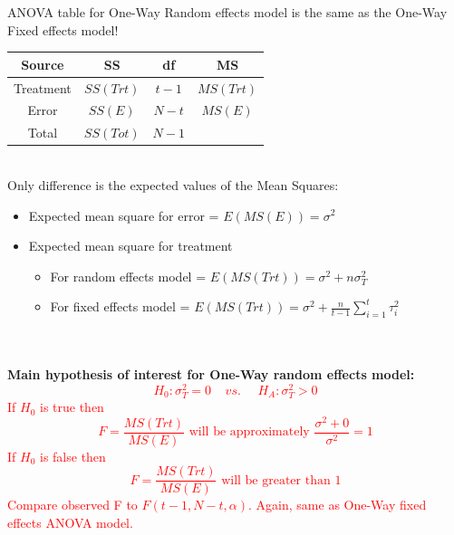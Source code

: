 ANOVA table for One-Way Random effects model is the same as the One-Way Fixed effects model!
\begin{center}
\begin{tabular}{cccc}
Source & SS & df & MS  \\ \hline
Treatment & $SS(Trt)$ & $t-1$ & $MS(Trt)$  \\
Error & $SS(E)$ & $N-t$ & $MS(E)$  \\
Total & $SS(Tot)$ & $N-1$ & \\ \hline
\end{tabular}
\end{center}
~\\
Only difference is the expected values of the Mean Squares:
\begin{itemize}
\item Expected mean square for error = $E(MS(E))=\sigma^2$
\item Expected mean square for treatment 
\begin{itemize}
\item For random effects model = $E(MS(Trt))=\sigma^2+n\sigma^2_T$\\
\item For fixed effects model = $E(MS(Trt))=\sigma^2+\frac{n}{t-1}\sum_{i=1}^{t}\tau_i^2$\\~\\~\\
\end{itemize}
\end{itemize}


\textbf{Main hypothesis of interest for One-Way random effects model:}
\textcolor{red}{$$H_0:\sigma^2_T=0~~~~~vs.~~~~~~H_A:\sigma^2_T>0$$
If $H_0$ is true then
$$F=\frac{MS(Trt)}{MS(E)}\mbox{ will be approximately }\frac{\sigma^2+0}{\sigma^2}=1$$
If $H_0$ is false then
$$F=\frac{MS(Trt)}{MS(E)}\mbox{ will be greater than }1$$
Compare observed F to $F(t-1,N-t,\alpha)$.  Again, same as One-Way fixed effects ANOVA model.}\\~\\~\\

\newpage

